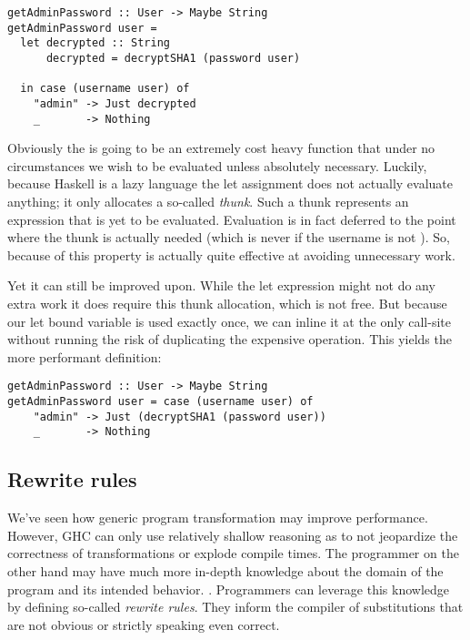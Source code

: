 \begin{listing}[H]
\begin{verbatim}
getAdminPassword :: User -> Maybe String
getAdminPassword user = 
  let decrypted :: String
      decrypted = decryptSHA1 (password user)

  in case (username user) of
    "admin" -> Just decrypted
    _       -> Nothing
\end{verbatim}
\end{listing}

Obviously the  is going to be an extremely cost heavy function that under no
circumstances we wish to be evaluated unless absolutely necessary. Luckily, because Haskell is a
lazy language the let assignment does not actually evaluate anything; it only allocates a so-called
\textit{thunk}. Such a thunk represents an expression that is yet to be evaluated. Evaluation is
in fact deferred to the point where the thunk is actually needed (which is never if the username is
not ). So, because of this property  is actually quite effective 
at avoiding unnecessary work. 

Yet it can still be improved upon. While the let expression might not do any extra work it does require
this thunk allocation, which is not free. But because our let bound variable  
is used exactly once, we can inline it at the only call-site without running the risk of duplicating 
the expensive operation. This yields the more performant definition:

\begin{listing}[H]
\begin{verbatim}
getAdminPassword :: User -> Maybe String
getAdminPassword user = case (username user) of
    "admin" -> Just (decryptSHA1 (password user))
    _       -> Nothing
\end{verbatim}
\end{listing}

\subsection{Rewrite rules}
\label{section:introduction:rewrite_rules}

We've seen how generic program transformation may improve performance. However, GHC can only use relatively
shallow reasoning as to not jeopardize the correctness of transformations or explode compile times. 
The programmer on the other hand may have much more in-depth knowledge about the domain of the program 
and its intended behavior. \cite{playing_by_the_rules}.
Programmers can leverage this knowledge by defining so-called \textit{rewrite rules}. They inform the compiler of
substitutions that are not obvious or strictly speaking even correct.  


